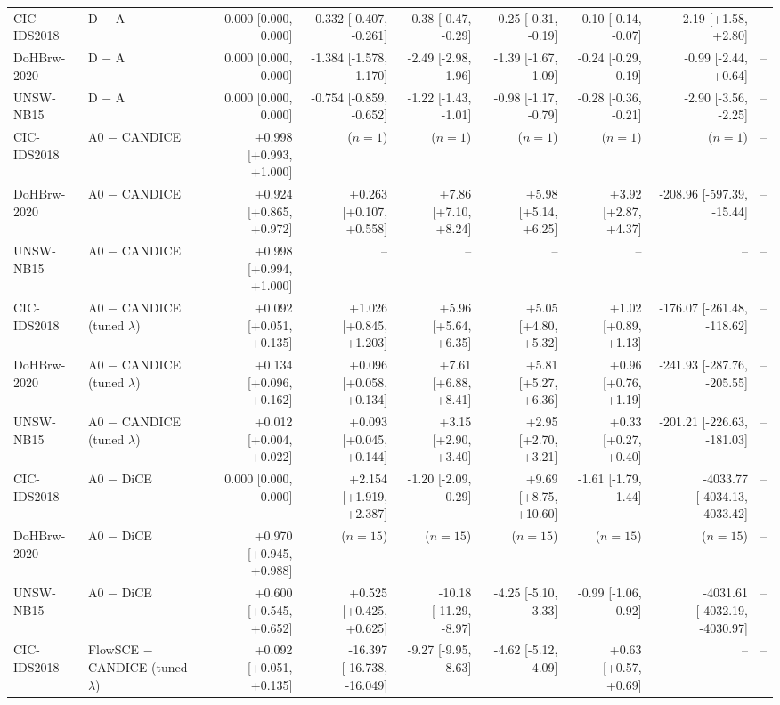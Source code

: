 \begin{table}[t]
\begin{tabular}{@{}llrrrrrrr@{}}
CIC-IDS2018 & D $-$ A & 0.000 [0.000, 0.000] & -0.332 [-0.407, -0.261] & -0.38 [-0.47, -0.29] & -0.25 [-0.31, -0.19] & -0.10 [-0.14, -0.07] & +2.19 [+1.58, +2.80] & -- \\
DoHBrw-2020 & D $-$ A & 0.000 [0.000, 0.000] & -1.384 [-1.578, -1.170] & -2.49 [-2.98, -1.96] & -1.39 [-1.67, -1.09] & -0.24 [-0.29, -0.19] & -0.99 [-2.44, +0.64] & -- \\
UNSW-NB15 & D $-$ A & 0.000 [0.000, 0.000] & -0.754 [-0.859, -0.652] & -1.22 [-1.43, -1.01] & -0.98 [-1.17, -0.79] & -0.28 [-0.36, -0.21] & -2.90 [-3.56, -2.25] & -- \\
CIC-IDS2018 & A0 $-$ CANDICE & +0.998 [+0.993, +1.000] & ($n=1$) & ($n=1$) & ($n=1$) & ($n=1$) & ($n=1$) & -- \\
DoHBrw-2020 & A0 $-$ CANDICE & +0.924 [+0.865, +0.972] & +0.263 [+0.107, +0.558] & +7.86 [+7.10, +8.24] & +5.98 [+5.14, +6.25] & +3.92 [+2.87, +4.37] & -208.96 [-597.39, -15.44] & -- \\
UNSW-NB15 & A0 $-$ CANDICE & +0.998 [+0.994, +1.000] & -- & -- & -- & -- & -- & -- \\
CIC-IDS2018 & A0 $-$ CANDICE (tuned $\lambda$) & +0.092 [+0.051, +0.135] & +1.026 [+0.845, +1.203] & +5.96 [+5.64, +6.35] & +5.05 [+4.80, +5.32] & +1.02 [+0.89, +1.13] & -176.07 [-261.48, -118.62] & -- \\
DoHBrw-2020 & A0 $-$ CANDICE (tuned $\lambda$) & +0.134 [+0.096, +0.162] & +0.096 [+0.058, +0.134] & +7.61 [+6.88, +8.41] & +5.81 [+5.27, +6.36] & +0.96 [+0.76, +1.19] & -241.93 [-287.76, -205.55] & -- \\
UNSW-NB15 & A0 $-$ CANDICE (tuned $\lambda$) & +0.012 [+0.004, +0.022] & +0.093 [+0.045, +0.144] & +3.15 [+2.90, +3.40] & +2.95 [+2.70, +3.21] & +0.33 [+0.27, +0.40] & -201.21 [-226.63, -181.03] & -- \\
CIC-IDS2018 & A0 $-$ DiCE & 0.000 [0.000, 0.000] & +2.154 [+1.919, +2.387] & -1.20 [-2.09, -0.29] & +9.69 [+8.75, +10.60] & -1.61 [-1.79, -1.44] & -4033.77 [-4034.13, -4033.42] & -- \\
DoHBrw-2020 & A0 $-$ DiCE & +0.970 [+0.945, +0.988] & ($n=15$) & ($n=15$) & ($n=15$) & ($n=15$) & ($n=15$) & -- \\
UNSW-NB15 & A0 $-$ DiCE & +0.600 [+0.545, +0.652] & +0.525 [+0.425, +0.625] & -10.18 [-11.29, -8.97] & -4.25 [-5.10, -3.33] & -0.99 [-1.06, -0.92] & -4031.61 [-4032.19, -4030.97] & -- \\
CIC-IDS2018 & FlowSCE $-$ CANDICE (tuned $\lambda$) & +0.092 [+0.051, +0.135] & -16.397 [-16.738, -16.049] & -9.27 [-9.95, -8.63] & -4.62 [-5.12, -4.09] & +0.63 [+0.57, +0.69] & -- & -- \\

\end{tabular}
\end{table}
